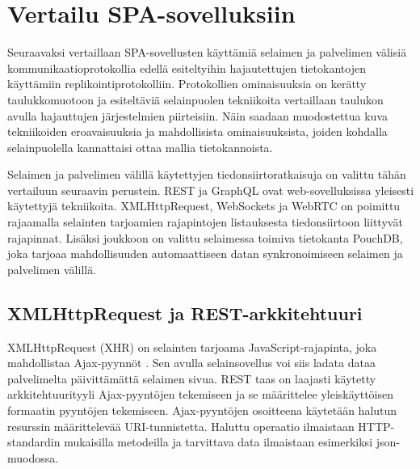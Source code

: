 \documentclass[finnish,twoside,censored,csm,sw-track-2018]{HYthesisML}
\begin{document}
\section{Vertailu SPA-sovelluksiin}

Seuraavaksi vertaillaan SPA-sovellusten käyttämiä selaimen ja palvelimen välisiä kommunikaatioprotokollia edellä esiteltyihin hajautettujen tietokantojen käyttämiin replikointiprotokolliin. Protokollien ominaisuuksia on kerätty taulukkomuotoon ja esiteltäviä selainpuolen tekniikoita vertaillaan taulukon avulla hajauttujen järjestelmien piirteisiin. Näin saadaan muodostettua kuva tekniikoiden eroavaisuuksia ja mahdollisista ominaisuuksista, joiden kohdalla selainpuolella kannattaisi ottaa mallia tietokannoista.

Selaimen ja palvelimen välillä käytettyjen tiedonsiirtoratkaisuja on valittu tähän vertailuun seuraavin perustein. REST ja GraphQL ovat web-sovelluksissa yleisesti käytettyjä tekniikoita. XMLHttpRequest, WebSockets ja WebRTC on poimittu rajaamalla selainten tarjoamien rajapintojen \citep{web-apis} listauksesta tiedonsiirtoon liittyvät rajapinnat. Lisäksi joukkoon on valittu selaimessa toimiva tietokanta PouchDB, joka tarjoaa mahdollisuuden automaattiseen datan synkronoimiseen selaimen ja palvelimen välillä.

\subsection{XMLHttpRequest ja REST-arkkitehtuuri}

XMLHttpRequest (XHR) on selainten tarjoama JavaScript-rajapinta, joka mahdollistaa Ajax-pyynnöt \cite{xhr}. Sen avulla selainsovellus voi siis ladata dataa palvelimelta päivittämättä selaimen sivua. REST taas on laajasti käytetty arkkitehtuurityyli Ajax-pyyntöjen tekemiseen ja se määrittelee yleiskäyttöisen formaatin pyyntöjen tekemiseen. Ajax-pyyntöjen osoitteena käytetään halutun resurssin määrittelevää URI-tunnistetta. Haluttu operaatio ilmaistaan HTTP-standardin mukaisilla metodeilla ja tarvittava data ilmaistaan esimerkiksi json-muodossa.
\end{document}
